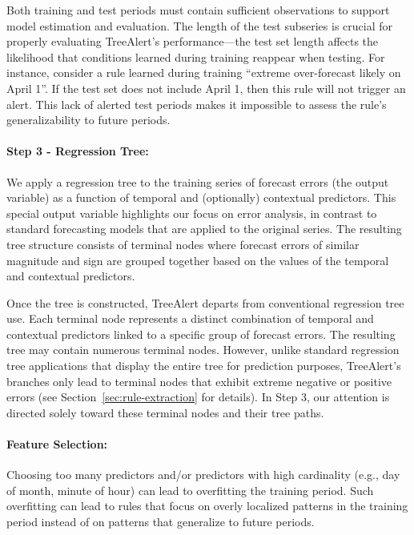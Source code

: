 \documentclass[]{interact}
\theoremstyle{definition}
\begin{document}

Both training and test periods must contain sufficient observations to support model estimation and evaluation.
The length of the test subseries is crucial for properly evaluating TreeAlert's performance---the test set length affects %
the likelihood that conditions learned during training reappear when testing. For instance, consider a rule learned during training ``extreme over-forecast likely on April 1''. If the test set does not include April 1, then this rule will not trigger an alert. This lack of alerted test periods makes it impossible to assess the rule's generalizability to future periods.

\paragraph*{Step 3 - Regression Tree:}
We apply a regression tree to the training series of forecast errors (the output variable) as a function of temporal and (optionally) contextual predictors. This special output variable highlights our focus on error analysis, in contrast to standard forecasting models that are applied to the original series. The resulting tree structure consists of terminal nodes where forecast errors of similar magnitude and sign are grouped together based on the values of the temporal and contextual predictors. 

Once the tree is constructed, TreeAlert departs from conventional regression tree use. Each terminal node represents a distinct combination of temporal and contextual predictors linked to a specific group of forecast errors. The resulting tree may contain numerous terminal nodes. However, unlike standard regression tree applications that display the entire tree for prediction purposes, TreeAlert’s branches only lead to terminal nodes that exhibit extreme negative or positive errors (see Section~\ref{sec:rule-extraction} for details). In Step 3, our attention is directed solely toward these terminal nodes and their tree paths.

\paragraph*{Feature Selection:}
Choosing too many predictors and/or predictors with high cardinality (e.g., day of month, minute of hour) can lead to overfitting the training period. Such overfitting can lead to rules that focus on overly localized patterns in the training period instead of on patterns that generalize to future periods. 
\end{document}
